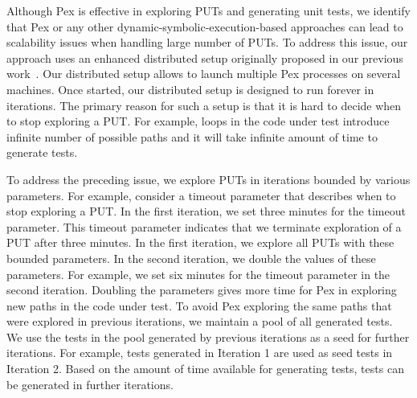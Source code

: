 Although Pex is effective in exploring PUTs and generating unit tests,
we identify that Pex or any other dynamic-symbolic-execution-based approaches
can lead to scalability issues when handling large number 
of PUTs. To address this issue, our approach uses an enhanced distributed 
setup originally proposed in our previous work~\cite{tillman:pexwhite}.
Our distributed setup allows to launch multiple Pex processes on several machines.
Once started, our distributed setup is designed to run forever in iterations. 
The primary reason for such a setup is that it is hard to 
decide when to stop exploring a PUT. For example, loops in the
code under test introduce infinite number of possible paths and 
it will take infinite amount of time to generate tests.

To address the preceding issue, we explore PUTs in iterations bounded by
various parameters. For example, consider a timeout parameter that describes
when to stop exploring a PUT. In the first iteration, we set three minutes
for the timeout parameter. This timeout parameter indicates that we terminate
exploration of a PUT after three minutes. In the first iteration, we explore all PUTs with
these bounded parameters. In the second iteration, we double the values
of these parameters. For example, we set six minutes for the timeout parameter
in the second iteration. Doubling the parameters gives more time for
Pex in exploring new paths in the code under test. 
To avoid Pex exploring the same paths that were explored in previous iterations, we 
maintain a pool of all generated tests. We use the tests in the pool generated
by previous iterations as a seed for further iterations.
For example, tests generated in Iteration 1 are used as seed tests in Iteration 2. 
Based on the amount of time available for generating tests, tests can be generated in further iterations.
